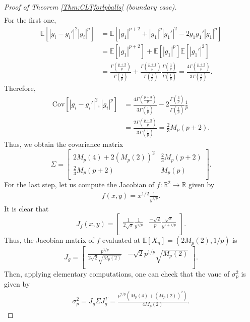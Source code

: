 \documentclass[10pt]{amsart}
\def\R{\mathbb{R}}
\def\E{\mathbb{E}}
\def\cov{\text{Cov}}
\numberwithin{equation}{section}
\begin{document}
\begin{proof}[Proof of Theorem \ref{Thm:CLTforlpballs} (boundary case)]
\begin{align*}
\end{align*}
For the first one,
\begin{align*}
\E [ \left| g_i - g_i'\right|^2  \left| g_i \right|^p] & = \E[ |g_1|^{p+2} + |g_1|^p|g_1'|^2 - 2g_1 g_1' |g_1|^p ]
 \\
  & =  \E[ |g_1|^{p+2}] +  \E[ |g_1|^{p}]  \E[ |g_1'|^{2}]
 \\
  & = \frac{\Gamma \left( \frac{p+3}{p} \right)}{\Gamma \left( \frac{1}{p} \right)} + \frac{\Gamma \left( \frac{p+1}{p} \right)}{\Gamma \left( \frac{1}{p} \right)} \frac{\Gamma \left( \frac{3}{p} \right)}{\Gamma \left( \frac{1}{p} \right)} = \frac{4\Gamma \left( \frac{p+3}{p} \right)}{3\Gamma \left( \frac{1}{p} \right)} .
\end{align*}
Therefore,
\begin{align*}
\cov[\left| g_i - g_i'\right|^2 , \left| g_i\right|^p ] & = \frac{4\Gamma \left( \frac{p+3}{p} \right)}{3\Gamma \left( \frac{1}{p} \right)} - 2 \frac{\Gamma \left( \frac{3}{p} \right)}{\Gamma \left( \frac{1}{p} \right)} \frac{1}{p}
 \\
 & = \frac{2 \Gamma \left( \frac{p+3}{p} \right)}{3\Gamma \left( \frac{1}{p} \right)} = \frac{2}{3} M_{p} (p+2).
\end{align*}
Thus, we obtain the covariance matrix
\[
   \Sigma = 
  \left[ {\begin{array}{cc}
   2 M_p(4) + 2 (M_p(2))^2 & \frac{2}{3} M_{p} (p+2) \\
   \frac{2}{3} M_{p} (p+2)  &  M_p(p) \\
  \end{array} } \right].
\]
For the last step, let us compute the Jacobian of $f: \R^2 \to \R$ given by
\begin{align*}
f(x,y) =  x^{1/2} \frac{1}{y^{1/p}}  .
\end{align*} 
It is clear that 
\[
   J_f (x,y) = 
  \left[ {\begin{array}{cc}
   \frac{1}{2\sqrt{x}} \frac{1}{y^{1/p}}  & \frac{-\sqrt{2}}{p} \frac{\sqrt{x}}{y^{1+ 1/p}}  \\
  \end{array} } \right] .
\]
Thus, the Jacobian matrix of $f$ evaluated at $\E[X_n] = \left( 2 M_p(2) , 1/p \right)$ is
\[
   J_g = 
  \left[ {\begin{array}{cc}
   \frac{p^{1/p} }{2 \sqrt{2} \sqrt{M_p(2)}}  & - \sqrt{2}  p^{1/p} \sqrt{M_p(2)} \\
  \end{array} } \right] .
\]
Then, applying elementary computations, one can check that the vaue of $\sigma_p ^2$ is given by
\begin{align*}
\sigma_p ^2 = J_g \Sigma J_g ^T = \frac{p^{2/p} \left( M_p(4) + (M_p(2))^2 \right)}{4 M_p(2)}.
\end{align*}
\end{proof}
\end{document}
